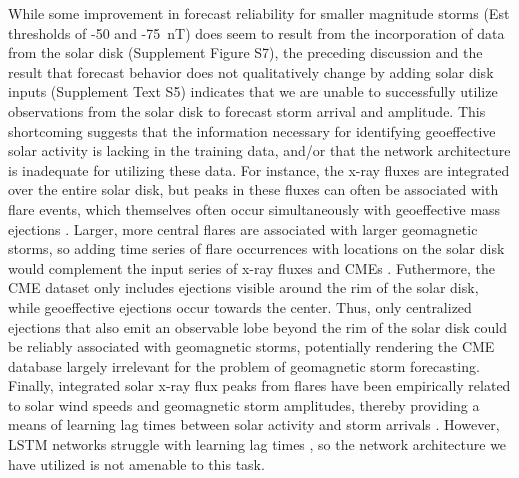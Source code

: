 While some improvement in forecast reliability for smaller magnitude storms (Est thresholds of -50 and -75~nT) does seem to result from the incorporation of data from the solar disk (Supplement Figure S7), the preceding discussion and the result that forecast behavior does not qualitatively change by adding solar disk inputs (Supplement Text S5) indicates that we are unable to successfully utilize observations from the solar disk to forecast storm arrival and amplitude. This shortcoming suggests that the information necessary for identifying geoeffective solar activity is lacking in the training data, and/or that the network architecture is inadequate for utilizing these data. For instance, the x-ray fluxes are integrated over the entire solar disk, but peaks in these fluxes can often be associated with flare events, which themselves often occur simultaneously with geoeffective mass ejections \citep{Tobiska2013}. Larger, more central flares are associated with larger geomagnetic storms, so adding time series of flare occurrences with locations on the solar disk would complement the input series of x-ray fluxes and CMEs \citep{Tobiska2013}. Futhermore, the CME dataset only includes ejections visible around the rim of the solar disk, while geoeffective ejections occur towards the center. Thus, only centralized ejections that also emit an observable lobe beyond the rim of the solar disk could be reliably associated with geomagnetic storms, potentially rendering the CME database largely irrelevant for the problem of geomagnetic storm forecasting. Finally, integrated solar x-ray flux peaks from flares have been empirically related to solar wind speeds and geomagnetic storm amplitudes, thereby providing a means of learning lag times between solar activity and storm arrivals \citep{Tobiska2013}. However, LSTM networks struggle with learning lag times \citep{Gers2002}, so the network architecture we have utilized is not amenable to this task.  
